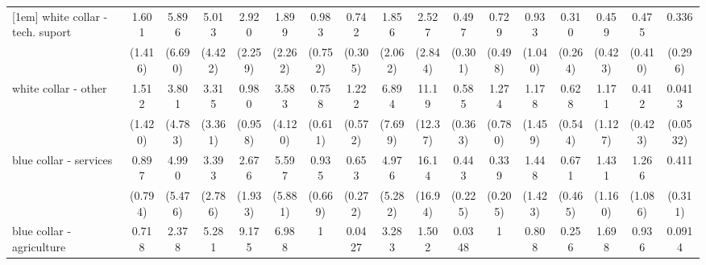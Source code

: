 {\begin{tabular}{l*{16}{c}}
[1em]
white collar - tech. suport&       1.601         &       5.896         &       5.013         &       2.920         &       1.899         &       0.983         &       0.742         &       1.856         &       2.527         &       0.497         &       0.729         &       0.933         &       0.310         &       0.459         &       0.475         &       0.336         \\
                    &     (1.416)         &     (6.690)         &     (4.422)         &     (2.259)         &     (2.262)         &     (0.752)         &     (0.305)         &     (2.062)         &     (2.844)         &     (0.301)         &     (0.498)         &     (1.040)         &     (0.264)         &     (0.423)         &     (0.410)         &     (0.296)         \\
[1em]
white collar - other&       1.512         &       3.801         &       3.315         &       0.980         &       3.583         &       0.758         &       1.222         &       6.894         &       11.19\sym{*}  &       0.585         &       1.274         &       1.178         &       0.628         &       1.171         &       0.412         &      0.0413\sym{*}  \\
                    &     (1.420)         &     (4.783)         &     (3.361)         &     (0.958)         &     (4.120)         &     (0.611)         &     (0.572)         &     (7.699)         &     (12.37)         &     (0.363)         &     (0.780)         &     (1.459)         &     (0.544)         &     (1.127)         &     (0.423)         &    (0.0532)         \\
[1em]
blue collar - services&       0.897         &       4.990         &       3.393         &       2.676         &       5.597         &       0.935         &       0.653         &       4.976         &       16.14\sym{**} &       0.443         &       0.339         &       1.448         &       0.671         &       1.431         &       1.266         &       0.411         \\
                    &     (0.794)         &     (5.476)         &     (2.786)         &     (1.933)         &     (5.881)         &     (0.669)         &     (0.272)         &     (5.282)         &     (16.94)         &     (0.225)         &     (0.205)         &     (1.423)         &     (0.465)         &     (1.160)         &     (1.086)         &     (0.311)         \\
[1em]
blue collar - agriculture&       0.718         &       2.378         &       5.281         &       9.175\sym{*}  &       6.988         &           1         &      0.0427\sym{**} &       3.283         &       1.502         &      0.0348\sym{**} &           1         &       0.808         &       0.256         &       1.698         &       0.936         &      0.0914\sym{*}  \\

\end{tabular}}
